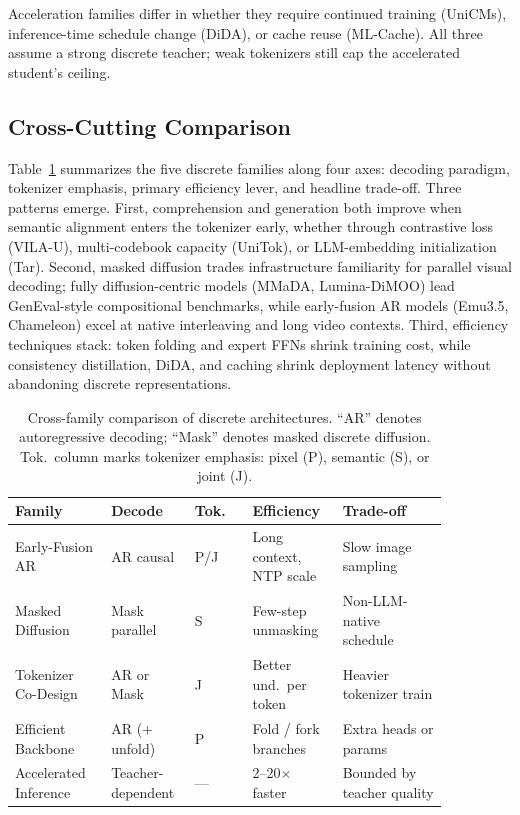Acceleration families differ in whether they require continued training (UniCMs), inference-time schedule change (DiDA), or cache reuse (ML-Cache). All three assume a strong discrete teacher; weak tokenizers still cap the accelerated student's ceiling.

\subsection{Cross-Cutting Comparison}
\label{subsec:discrete-comparison}

Table~\ref{tab:discrete-compare} summarizes the five discrete families along four axes: decoding paradigm, tokenizer emphasis, primary efficiency lever, and headline trade-off. Three patterns emerge. First, comprehension and generation both improve when semantic alignment enters the tokenizer early, whether through contrastive loss (VILA-U), multi-codebook capacity (UniTok), or LLM-embedding initialization (Tar). Second, masked diffusion trades infrastructure familiarity for parallel visual decoding; fully diffusion-centric models (MMaDA, Lumina-DiMOO) lead GenEval-style compositional benchmarks, while early-fusion AR models (Emu3.5, Chameleon) excel at native interleaving and long video contexts. Third, efficiency techniques stack: token folding and expert FFNs shrink training cost, while consistency distillation, DiDA, and caching shrink deployment latency without abandoning discrete representations.

\begin{table}[t]
  \caption{Cross-family comparison of discrete architectures. ``AR'' denotes autoregressive decoding; ``Mask'' denotes masked discrete diffusion. Tok.\ column marks tokenizer emphasis: pixel (P), semantic (S), or joint (J).}
  \label{tab:discrete-compare}
  \small
  \setlength{\tabcolsep}{4pt}
  \begin{tabular}{@{}p{0.20\linewidth}p{0.14\linewidth}p{0.12\linewidth}p{0.18\linewidth}p{0.22\linewidth}@{}}
    \toprule
    Family & Decode & Tok. & Efficiency & Trade-off \\
    \midrule
    Early-Fusion AR      & AR causal       & P/J & Long context, NTP scale & Slow image sampling \\
    Masked Diffusion     & Mask parallel   & S   & Few-step unmasking      & Non-LLM-native schedule \\
    Tokenizer Co-Design  & AR or Mask      & J   & Better und.\ per token  & Heavier tokenizer train \\
    Efficient Backbone   & AR (+ unfold)   & P   & Fold / fork branches    & Extra heads or params \\
    Accelerated Inference& Teacher-dependent & --- & 2--20$\times$ faster   & Bounded by teacher quality \\
    \bottomrule
  \end{tabular}
\end{table}

